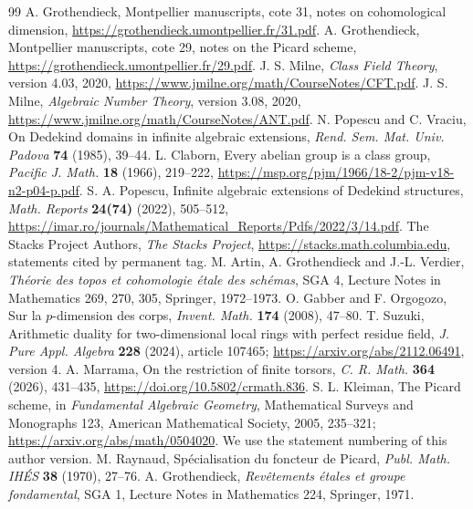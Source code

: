 \begin{thebibliography}{99}
 A. Grothendieck, Montpellier manuscripts, cote 31,
notes on cohomological dimension, \url{https://grothendieck.umontpellier.fr/31.pdf}.
 A. Grothendieck, Montpellier manuscripts, cote 29,
notes on the Picard scheme, \url{https://grothendieck.umontpellier.fr/29.pdf}.
 J. S. Milne, \emph{Class Field Theory}, version 4.03,
2020, \url{https://www.jmilne.org/math/CourseNotes/CFT.pdf}.
 J. S. Milne, \emph{Algebraic Number Theory}, version 3.08,
2020, \url{https://www.jmilne.org/math/CourseNotes/ANT.pdf}.
 N. Popescu and C. Vraciu,
On Dedekind domains in infinite algebraic extensions,
\emph{Rend. Sem. Mat. Univ. Padova} \textbf{74} (1985), 39--44.
 L. Claborn, Every abelian group is a class group,
\emph{Pacific J. Math.} \textbf{18} (1966), 219--222,
\url{https://msp.org/pjm/1966/18-2/pjm-v18-n2-p04-p.pdf}.
 S. A. Popescu,
Infinite algebraic extensions of Dedekind structures,
\emph{Math. Reports} \textbf{24(74)} (2022), 505--512,
\url{https://imar.ro/journals/Mathematical_Reports/Pdfs/2022/3/14.pdf}.
 The Stacks Project Authors, \emph{The Stacks Project},
\url{https://stacks.math.columbia.edu}, statements cited by permanent tag.
 M. Artin, A. Grothendieck and J.-L. Verdier,
\emph{Th\'eorie des topos et cohomologie \'etale des sch\'emas},
SGA 4, Lecture Notes in Mathematics 269, 270, 305, Springer, 1972--1973.
 O. Gabber and F. Orgogozo,
Sur la $p$-dimension des corps,
\emph{Invent. Math.} \textbf{174} (2008), 47--80.
 T. Suzuki, Arithmetic duality for two-dimensional local
rings with perfect residue field,
\emph{J. Pure Appl. Algebra} \textbf{228} (2024), article 107465;
\url{https://arxiv.org/abs/2112.06491}, version 4.
 A. Marrama, On the restriction of finite torsors,
\emph{C. R. Math.} \textbf{364} (2026), 431--435,
\url{https://doi.org/10.5802/crmath.836}.
 S. L. Kleiman, The Picard scheme, in
\emph{Fundamental Algebraic Geometry}, Mathematical Surveys and
Monographs 123, American Mathematical Society, 2005, 235--321;
\url{https://arxiv.org/abs/math/0504020}. We use the statement
numbering of this author version.
 M. Raynaud, Sp\'ecialisation du foncteur de Picard,
\emph{Publ. Math. IH\'ES} \textbf{38} (1970), 27--76.
 A. Grothendieck, \emph{Rev\^etements \'etales et groupe
fondamental}, SGA 1, Lecture Notes in Mathematics 224, Springer, 1971.

\end{thebibliography}
